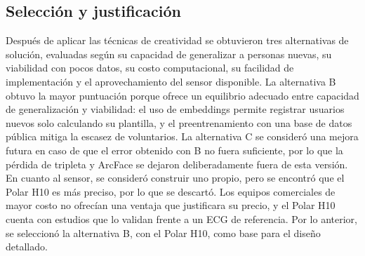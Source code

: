 
\subsection{Selección y justificación}

Después de aplicar las técnicas de creatividad se obtuvieron tres alternativas de solución, evaluadas según su capacidad de generalizar a personas nuevas, su viabilidad con pocos datos, su costo computacional, su facilidad de implementación y el aprovechamiento del sensor disponible. La alternativa B obtuvo la mayor puntuación porque ofrece un equilibrio adecuado entre capacidad de generalización y viabilidad: el uso de embeddings permite registrar usuarios nuevos solo calculando su plantilla, y el preentrenamiento con una base de datos pública mitiga la escasez de voluntarios. La alternativa C se consideró una mejora futura en caso de que el error obtenido con B no fuera suficiente, por lo que la pérdida de tripleta y ArcFace se dejaron deliberadamente fuera de esta versión. En cuanto al sensor, se consideró construir uno propio, pero se encontró que el Polar H10 es más preciso, por lo que se descartó. Los equipos comerciales de mayor costo no ofrecían una ventaja que justificara su precio, y el Polar H10 cuenta con estudios que lo validan frente a un ECG de referencia. Por lo anterior, se seleccionó la alternativa B, con el Polar H10, como base para el diseño detallado.

